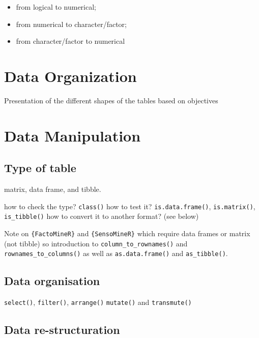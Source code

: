 \documentclass[
]{book}
\providecommand{\tightlist}{%
  \setlength{\itemsep}{0pt}\setlength{\parskip}{0pt}}
\begin{document}
\begin{itemize}
\tightlist
\item
  from logical to numerical;
\item
  from numerical to character/factor;
\item
  from character/factor to numerical
\end{itemize}

\hypertarget{data-organization}{%
\section{Data Organization}\label{data-organization}}

Presentation of the different shapes of the tables based on objectives

\hypertarget{data-manipulation}{%
\section{Data Manipulation}\label{data-manipulation}}

\hypertarget{type-of-table}{%
\subsection{Type of table}\label{type-of-table}}

matrix, data frame, and tibble.

how to check the type? \texttt{class()}
how to test it? \texttt{is.data.frame()}, \texttt{is.matrix()}, \texttt{is\_tibble()}
how to convert it to another format? (see below)

Note on \texttt{\{FactoMineR\}} and \texttt{\{SensoMineR\}} which require data frames or matrix (not tibble) so introduction to \texttt{column\_to\_rownames()} and \texttt{rownames\_to\_columns()} as well as \texttt{as.data.frame()} and \texttt{as\_tibble()}.

\hypertarget{data-organisation}{%
\subsection{Data organisation}\label{data-organisation}}

\texttt{select()}, \texttt{filter()}, \texttt{arrange()}
\texttt{mutate()} and \texttt{transmute()}

\hypertarget{data-re-structuration}{%
\subsection{Data re-structuration}\label{data-re-structuration}}
\end{document}
